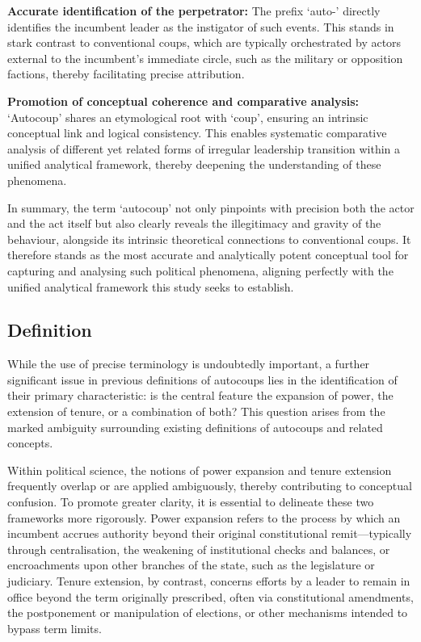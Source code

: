 \documentclass[
  12pt,
]{report}
\begin{document}
\textbf{Accurate identification of the perpetrator:} The prefix `auto-'
directly identifies the incumbent leader as the instigator of such
events. This stands in stark contrast to conventional coups, which are
typically orchestrated by actors external to the incumbent's immediate
circle, such as the military or opposition factions, thereby
facilitating precise attribution.

\textbf{Promotion of conceptual coherence and comparative analysis:}
`Autocoup' shares an etymological root with `coup', ensuring an
intrinsic conceptual link and logical consistency. This enables
systematic comparative analysis of different yet related forms of
irregular leadership transition within a unified analytical framework,
thereby deepening the understanding of these phenomena.

In summary, the term `autocoup' not only pinpoints with precision both
the actor and the act itself but also clearly reveals the illegitimacy
and gravity of the behaviour, alongside its intrinsic theoretical
connections to conventional coups. It therefore stands as the most
accurate and analytically potent conceptual tool for capturing and
analysing such political phenomena, aligning perfectly with the unified
analytical framework this study seeks to establish.

\subsection*{Definition}\label{sec-definition}

While the use of precise terminology is undoubtedly important, a further
significant issue in previous definitions of autocoups lies in the
identification of their primary characteristic: is the central feature
the expansion of power, the extension of tenure, or a combination of
both? This question arises from the marked ambiguity surrounding
existing definitions of autocoups and related concepts.

Within political science, the notions of power expansion and tenure
extension frequently overlap or are applied ambiguously, thereby
contributing to conceptual confusion. To promote greater clarity, it is
essential to delineate these two frameworks more rigorously. Power
expansion refers to the process by which an incumbent accrues authority
beyond their original constitutional remit---typically through
centralisation, the weakening of institutional checks and balances, or
encroachments upon other branches of the state, such as the legislature
or judiciary. Tenure extension, by contrast, concerns efforts by a
leader to remain in office beyond the term originally prescribed, often
via constitutional amendments, the postponement or manipulation of
elections, or other mechanisms intended to bypass term limits.
\end{document}
